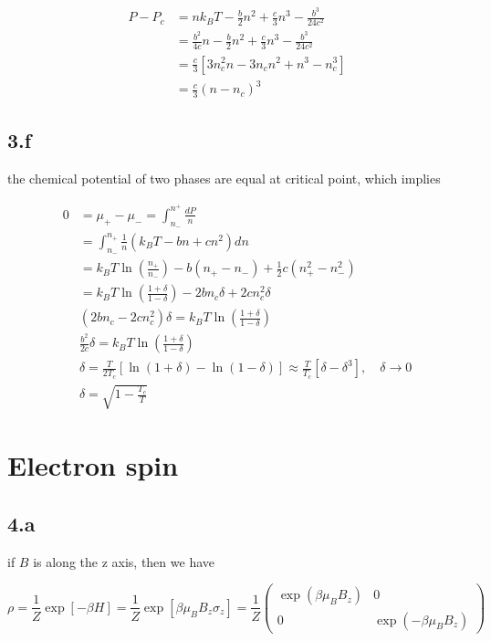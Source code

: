 \documentclass{article}
\begin{document}
$$
\begin{aligned}
    P - P_c &= n k_B T - \frac{b}{2}n^2 + \frac{c}{3}n^3 - \frac{b^3}{24c^2}\\
    &= \frac{b^2}{4c} n - \frac{b}{2}n^2 + \frac{c}{3}n^3 - \frac{b^3}{24c^2}\\
    &= \frac{c}{3}[3n_c^2 n - 3n_c n^2 + n^3 - n_c^3]\\
    &= \frac{c}{3} (n - n_c)^3
\end{aligned}
$$

\subsection*{3.f}
the chemical potential of two phases are equal at critical point, which implies

$$
\begin{aligned}
    0 &= \mu_{+} - \mu_{-} = \int_{n_{-}}^{n^{+}} \frac{dP}{n}\\
    &= \int_{n_{-}}^{n_{+}} \frac{1}{n} (k_B T - bn + cn^2) dn\\
    &= k_B T \ln(\frac{n_{+}}{n_{-}}) - b (n_{+} - n_{-}) + \frac{1}{2}c(n_{+}^2 - n_{-}^2)\\
    &= k_B T \ln(\frac{1+\delta}{1-\delta}) - 2b n_c \delta + 2 c n_c^2 \delta\\
    &(2b n_c - 2 c n_c^2)\delta = k_B T \ln(\frac{1+\delta}{1-\delta})\\
    &\frac{b^2}{2c}\delta = k_B T \ln(\frac{1+\delta}{1-\delta})\\
    &\delta = \frac{T}{2T_c} [\ln(1+\delta) - \ln(1-\delta)] \approx \frac{T}{T_c} [\delta - \delta^3], \quad \delta \rightarrow 0\\
    &\delta = \sqrt{1 - \frac{T_c}{T}}
\end{aligned}
$$

\section*{Electron spin}
\subsection*{4.a}
if $B$ is along the z axis, then we have

$$
\rho = \frac{1}{Z} \exp[-\beta H] = \frac{1}{Z} \exp[\beta\mu_B B_z \sigma_z] =
\frac{1}{Z}\begin{pmatrix}
    \exp(\beta\mu_B B_z) & 0\\
    0 & \exp(-\beta\mu_B B_z)
\end{pmatrix}
$$
\end{document}
